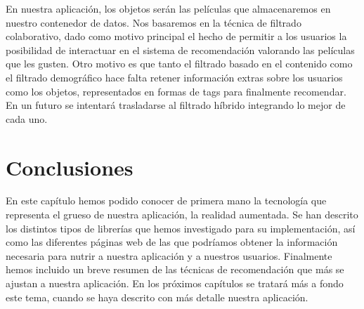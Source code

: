 En nuestra aplicación, los objetos serán las películas que almacenaremos en nuestro contenedor de datos. Nos basaremos en 
la técnica de filtrado colaborativo, dado como motivo principal el hecho de permitir a los usuarios la posibilidad de 
interactuar en el sistema de recomendación valorando las películas que les gusten. Otro motivo es que tanto el filtrado basado
en el contenido como el filtrado demográfico hace falta retener información extras sobre los usuarios como los objetos, representados 
en formas de tags para finalmente recomendar. En un futuro se intentará trasladarse al filtrado híbrido integrando lo mejor de 
cada uno.

\section{Conclusiones}
\label{makereference2.4}
En este capítulo hemos podido conocer de primera mano la tecnología que representa el grueso de nuestra aplicación, la realidad aumentada. Se han descrito 
los distintos tipos de librerías que hemos investigado para su implementación, así como las diferentes páginas web de las que podríamos obtener la información necesaria
para nutrir a nuestra aplicación y a nuestros usuarios. Finalmente hemos incluido un breve resumen de las técnicas de recomendación que más se ajustan a nuestra aplicación. En los próximos capítulos
se tratará más a fondo este tema, cuando se haya descrito con más detalle nuestra aplicación.

